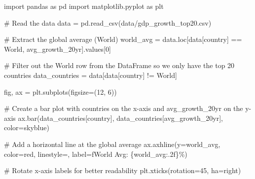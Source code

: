 \documentclass[
  letterpaper,
  DIV=11,
  numbers=noendperiod]{scrartcl}
\newenvironment{Shaded}{\begin{snugshade}}{\end{snugshade}}
\newcommand{\CommentTok}[1]{\textcolor[rgb]{0.37,0.37,0.37}{#1}}
\newcommand{\DecValTok}[1]{\textcolor[rgb]{0.68,0.00,0.00}{#1}}
\newcommand{\ImportTok}[1]{\textcolor[rgb]{0.00,0.46,0.62}{#1}}
\newcommand{\NormalTok}[1]{\textcolor[rgb]{0.00,0.23,0.31}{#1}}
\newcommand{\OperatorTok}[1]{\textcolor[rgb]{0.37,0.37,0.37}{#1}}
\newcommand{\SpecialCharTok}[1]{\textcolor[rgb]{0.37,0.37,0.37}{#1}}
\newcommand{\SpecialStringTok}[1]{\textcolor[rgb]{0.13,0.47,0.30}{#1}}
\newcommand{\StringTok}[1]{\textcolor[rgb]{0.13,0.47,0.30}{#1}}
\begin{document}
\begin{Shaded}
\begin{Highlighting}[]
\ImportTok{import}\NormalTok{ pandas }\ImportTok{as}\NormalTok{ pd}
\ImportTok{import}\NormalTok{ matplotlib.pyplot }\ImportTok{as}\NormalTok{ plt}

\CommentTok{\# Read the data}
\NormalTok{data }\OperatorTok{=}\NormalTok{ pd.read\_csv(}\StringTok{\textquotesingle{}data/gdp\_growth\_top20.csv\textquotesingle{}}\NormalTok{)}

\CommentTok{\# Extract the global average (World)}
\NormalTok{world\_avg }\OperatorTok{=}\NormalTok{ data.loc[data[}\StringTok{\textquotesingle{}country\textquotesingle{}}\NormalTok{] }\OperatorTok{==} \StringTok{\textquotesingle{}World\textquotesingle{}}\NormalTok{, }\StringTok{\textquotesingle{}avg\_growth\_20yr\textquotesingle{}}\NormalTok{].values[}\DecValTok{0}\NormalTok{]}

\CommentTok{\# Filter out the \textquotesingle{}World\textquotesingle{} row from the DataFrame so we only have the top 20 countries}
\NormalTok{data\_countries }\OperatorTok{=}\NormalTok{ data[data[}\StringTok{\textquotesingle{}country\textquotesingle{}}\NormalTok{] }\OperatorTok{!=} \StringTok{\textquotesingle{}World\textquotesingle{}}\NormalTok{]}

\NormalTok{fig, ax }\OperatorTok{=}\NormalTok{ plt.subplots(figsize}\OperatorTok{=}\NormalTok{(}\DecValTok{12}\NormalTok{, }\DecValTok{6}\NormalTok{))}

\CommentTok{\# Create a bar plot with countries on the x{-}axis and avg\_growth\_20yr on the y{-}axis}
\NormalTok{ax.bar(data\_countries[}\StringTok{\textquotesingle{}country\textquotesingle{}}\NormalTok{], data\_countries[}\StringTok{\textquotesingle{}avg\_growth\_20yr\textquotesingle{}}\NormalTok{], color}\OperatorTok{=}\StringTok{\textquotesingle{}skyblue\textquotesingle{}}\NormalTok{)}

\CommentTok{\# Add a horizontal line at the global average}
\NormalTok{ax.axhline(y}\OperatorTok{=}\NormalTok{world\_avg, color}\OperatorTok{=}\StringTok{\textquotesingle{}red\textquotesingle{}}\NormalTok{, linestyle}\OperatorTok{=}\StringTok{\textquotesingle{}{-}{-}\textquotesingle{}}\NormalTok{, label}\OperatorTok{=}\SpecialStringTok{f\textquotesingle{}World Avg: }\SpecialCharTok{\{}\NormalTok{world\_avg}\SpecialCharTok{:.2f\}}\SpecialStringTok{\%\textquotesingle{}}\NormalTok{)}

\CommentTok{\# Rotate x{-}axis labels for better readability}
\NormalTok{plt.xticks(rotation}\OperatorTok{=}\DecValTok{45}\NormalTok{, ha}\OperatorTok{=}\StringTok{\textquotesingle{}right\textquotesingle{}}\NormalTok{)}


\end{Highlighting}
\end{Shaded}
\end{document}
